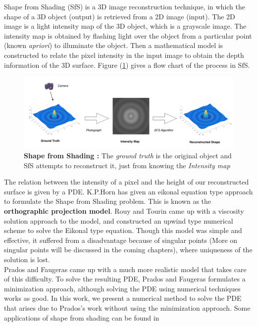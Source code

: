 
Shape from Shading (SfS) is a 3D image reconstruction technique, in which the shape of a 3D object (output) is retrieved from a 2D image (input). The 2D image is a light intensity map of the 3D object, which is a grayscale image. The intensity map is obtained by flashing light over the object from a particular point (known \textit{apriori}) to illuminate the object. Then a mathematical model is constructed to relate the pixel intensity in the input image to obtain the depth information of the 3D surface. Figure (\ref{fig:1}) gives a flow chart of the process in SfS.

\begin{figure}[h!]
	\centering
	\includegraphics[width = 15.5cm]{images/flow.png}
	\caption{\textbf{Shape from Shading :} The \emph{ground truth} is the original object and SfS attempts to reconstruct it, just from knowing the \textit{Intensity map}}
	\label{fig:1}
\end{figure}

\noindent
The relation between the intensity of a pixel and the height of our reconstructed surface is given by a PDE. K.P.Horn\cite{horn} has given an eikonal equation type approach to formulate the Shape from Shading problem. This is known as the \textbf{orthographic projection model}. Rouy and Tourin\cite{rouy} came up with a viscosity solution approach to the model, and constructed an upwind type numerical scheme to solve the Eikonal type equation. Though this model was simple and effective, it suffered from a disadvantage because of singular points (More on singular points will be discussed in the coming chapters), where uniqueness of the solution is lost.\\

\noindent
 Prados and Faugeras\cite{prados2} came up with a much more realistic model that takes care of this difficulty. To solve the resulting PDE, Prados and Faugeras\cite{prados1} formulates a minimization approach, although solving the PDE using numerical techniques works as good. In this work, we present a numerical method to solve the PDE that arises due to Prados's work without using the minimization approach. Some applications of shape from shading can be found in \cite{prados1}\\
 
